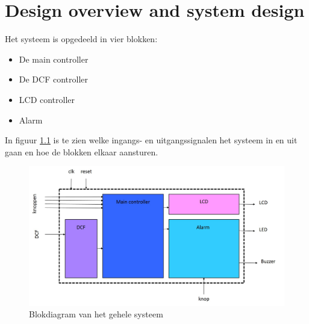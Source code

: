 \documentclass[dutch, oneside]{tudelft-report}
\begin{document}
\chapter{Design overview and system design}
Het systeem is opgedeeld in vier blokken:
\begin{itemize}
\item De main controller
\item De DCF controller
\item LCD controller
\item Alarm
\end{itemize}

\noindent In figuur \ref{fig:blokdiagram} is te zien welke ingangs- en uitgangssignalen het systeem in en uit gaan en hoe de blokken elkaar aansturen.

\begin{figure}[h!]
\center
\includegraphics[width=13cm]{figure/blokdiagram}
\caption{Blokdiagram van het gehele systeem}
\label{fig:blokdiagram}
\end{figure}
\end{document}
